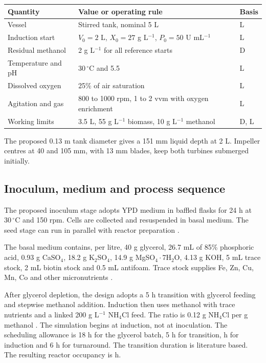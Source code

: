\documentclass[12pt,a4paper]{article}
\newcommand{\tighttable}{\setstretch{1.07}}
\begin{document}
\begin{center}\tighttable
{}
\begin{tabularx}{\textwidth}{@{}L{0.29\textwidth}YL{0.14\textwidth}@{}}\toprule
Quantity & Value or operating rule & Basis\\\midrule
Vessel & Stirred tank, nominal 5 L & L \cite{PonteThesis}\\
Induction start & $V_0=2$ L, $X_0=27$ g L$^{-1}$, $P_0=50$ U mL$^{-1}$ & L \cite{PonteThesis}\\
Residual methanol & 2 g L$^{-1}$ for all reference starts & D\\
Temperature and pH & 30\,$^{\circ}$C and 5.5 & L \cite{PonteThesis}\\
Dissolved oxygen & 25\% of air saturation & L \cite{PonteThesis}\\
Agitation and gas & 800 to 1000 rpm, 1 to 2 vvm with oxygen enrichment & L \cite{PonteThesis}\\
Working limits & 3.5 L, 55 g L$^{-1}$ biomass, 10 g L$^{-1}$ methanol & D, L \cite{PonteThesis}\\\bottomrule
\end{tabularx}
\end{center}

The proposed 0.13 m tank diameter gives a 151 mm liquid depth at 2 L. Impeller centres at 40 and 105 mm, with 13 mm blades, keep both turbines submerged initially.

\subsection{Inoculum, medium and process sequence}
The proposed inoculum stage adopts YPD medium in baffled flasks for 24 h at 30\,$^{\circ}$C and 150 rpm. Cells are collected and resuspended in basal medium. The seed stage can run in parallel with reactor preparation \cite{PonteThesis}.

The basal medium contains, per litre, 40 g glycerol, 26.7 mL of 85\% phosphoric acid, 0.93 g CaSO$_4$, 18.2 g K$_2$SO$_4$, 14.9 g MgSO$_4\!\cdot\!$7H$_2$O, 4.13 g KOH, 5 mL trace stock, 2 mL biotin stock and 0.5 mL antifoam. Trace stock supplies Fe, Zn, Cu, Mn, Co and other micronutrients \cite{PonteThesis}.

After glycerol depletion, the design adopts a 5 h transition with glycerol feeding and stepwise methanol addition. Induction then uses methanol with trace nutrients and a linked 200 g L$^{-1}$ NH$_4$Cl feed. The ratio is 0.12 g NH$_4$Cl per g methanol \cite{PonteThesis}. The simulation begins at induction, not at inoculation. The scheduling allowance is 18 h for the glycerol batch, 5 h for transition, \FinalTime{} h for induction and 6 h for turnaround. The transition duration is literature based. The resulting reactor occupancy is \Occupancy{} h.
\end{document}
